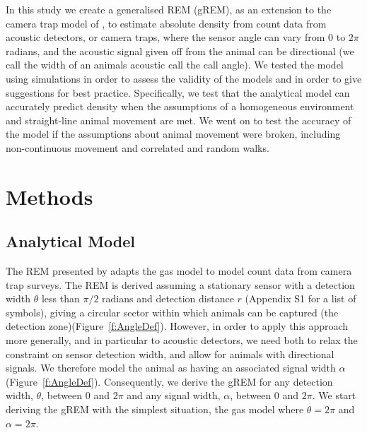 \documentclass[a4paper,10pt,reqno,oneside]{amsart}
\begin{document}

In this study we create a generalised REM (gREM), as an extension to the camera trap model of \citep{rowcliffe2008estimating}, to estimate absolute density from count data from acoustic detectors, or camera traps, where the sensor angle can vary from 0 to $2\pi$ radians, and the acoustic signal given off from the animal can be directional (we call the width of an animals acoustic call the call angle).  We tested the model using simulations in order to assess the validity of the models and in order to give suggestions for best practice. Specifically, we test that the analytical model can accurately predict density when the assumptions of a homogeneous environment and straight-line animal movement are met. We went on to test the accuracy of the model if the assumptions about animal movement were broken, including non-continuous movement and correlated and random walks. 

\section{Methods}

\subsection{Analytical Model}

The REM presented by \citep{rowcliffe2008estimating} adapts the gas model to model count data from camera trap surveys. The REM is derived assuming a stationary sensor with a detection width $\theta$ less than $\pi/2$ radians and detection distance $r$ (Appendix S1 for a list of symbols), giving a circular sector within which animals can be captured (the detection zone)(Figure~\ref{f:AngleDef}). However, in order to apply this approach more generally, and in particular to acoustic detectors, we need both to relax the constraint on sensor detection width, and allow for animals with directional signals. We therefore model the animal as having an associated signal width $\alpha$ (Figure~\ref{f:AngleDef}). Consequently, we derive the gREM for any detection width, $ \theta$, between 0 and $2\pi$ and any signal width, $ \alpha$, between 0 and $2\pi$. We start deriving the gREM with the simplest situation, the gas model where $\theta =  2\pi$ and $ \alpha =  2\pi$. 
\end{document}
